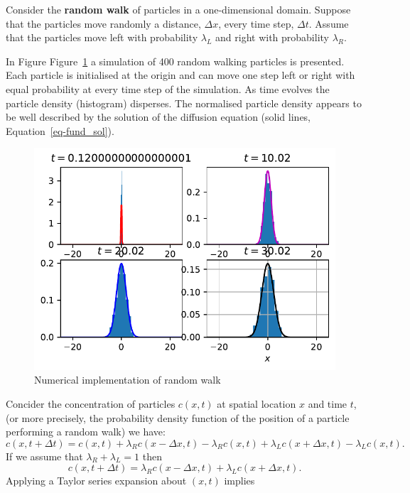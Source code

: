 \documentclass[
  letterpaper,
  DIV=11,
  numbers=noendperiod]{scrreprt}
\theoremstyle{definition}
\theoremstyle{plain}
\theoremstyle{plain}
\theoremstyle{remark}
\begin{document}
Consider the \textbf{random walk} of particles in a one-dimensional
domain. Suppose that the particles move randomly a distance,
\(\Delta x\), every time step, \(\Delta t\). Assume that the particles
move left with probability \(\lambda_L\) and right with probability
\(\lambda_R\).

In Figure Figure~\ref{fig-randomwalksim} a simulation of 400 random
walking particles is presented. Each particle is initialised at the
origin and can move one step left or right with equal probability at
every time step of the simulation. As time evolves the particle density
(histogram) disperses. The normalised particle density appears to be
well described by the solution of the diffusion equation (solid lines,
Equation~\ref{eq-fund_sol}).

\begin{figure}

{\centering \includegraphics{linearreactiondiffusion_files/figure-pdf/fig-randomwalksim-output-1.pdf}

}

\caption{\label{fig-randomwalksim}Numerical implementation of random
walk}

\end{figure}

Concider the concentration of particles \(c(x,t)\) at spatial location
\(x\) and time \(t\), (or more precisely, the probability density
function of the position of a particle performing a random walk) we
have: \[
c(x, t+ \Delta t) = c(x, t)  + \lambda_R c(x- \Delta x, t) - \lambda_R c(x, t) + \lambda_L c(x+ \Delta x, t) - \lambda_L c (x,t).
\] If we assume that \(\lambda_R+ \lambda_L =1\) then \[
c(x, t+ \Delta t) =  \lambda_R c(x- \Delta x, t) + \lambda_L c(x+ \Delta x, t).
\] Applying a Taylor series expansion about \((x,t)\) implies
\end{document}
